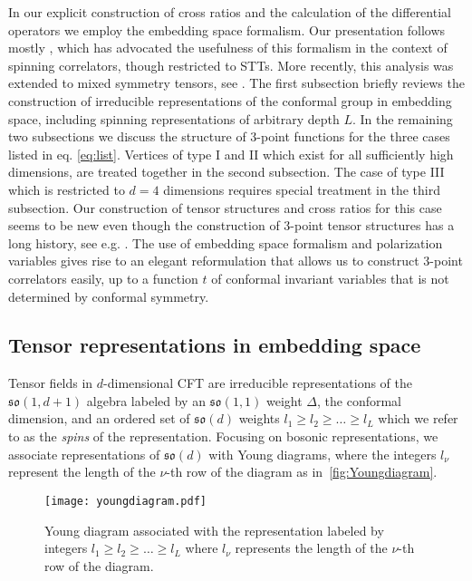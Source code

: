 \documentclass{article}
\begin{document}
In our explicit construction of cross ratios and the calculation of the differential
operators we employ the embedding space formalism. Our presentation follows mostly \cite{Costa:2011mg}, which has advocated the usefulness of this formalism in the
context of spinning correlators, though restricted to STTs. More recently, this analysis 
was extended to mixed symmetry tensors, see \cite{Costa_2015,Lauria:2018klo}. 
The first subsection briefly reviews the construction of irreducible representations of 
the conformal group in embedding space, including spinning representations of arbitrary 
depth $L$. In the remaining two subsections we discuss the structure of 3-point functions 
for the three cases listed in eq. \eqref{eq:list}. Vertices of type I and II which exist 
for all sufficiently high dimensions, are treated together in the second subsection. The 
case of type III which is restricted to $d=4$ dimensions requires special treatment in the 
third subsection. Our construction of tensor structures and cross ratios for this case  
seems to be new even though the construction of 3-point tensor structures has a long 
history, see e.g. \cite{Mack:1976pa,Osborn:1993cr}. The use of embedding space formalism 
and polarization variables gives rise to an elegant reformulation that allows us to construct 
3-point correlators easily, up to a function $t$ of conformal invariant variables 
\cite{Buric:2020dyz} that is not determined by conformal symmetry. 

\subsection{Tensor representations in embedding space}
\label{subsec:MSTinembspace}

Tensor fields in $d$-dimensional CFT are irreducible representations of the 
${\mathfrak{so}(1,d+1)}$ algebra labeled by an $\mathfrak{so}(1,1)$ weight $\Delta$, 
the conformal dimension, and an ordered set of $\mathfrak{so}(d)$ weights $l_1\ge l_2
\ge\dots\ge l_L$ which we refer to as the \emph{spins} of the representation. Focusing 
on bosonic representations, we associate representations of $\mathfrak{so}(d)$ with 
Young diagrams, where the integers $l_\nu$ represent the length of the $\nu$-th row 
of the diagram as in~\autoref{fig:Youngdiagram}.
\begin{figure}[thb]
\centering
\texttt{[image: youngdiagram.pdf]}
\caption{\small Young diagram associated with the representation labeled by integers $l_1\ge l_2\ge 
\dots \ge l_L$ where $l_\nu$ represents the length of the $\nu$-th row of the diagram.}
\label{fig:Youngdiagram}
\end{figure}
\end{document}
